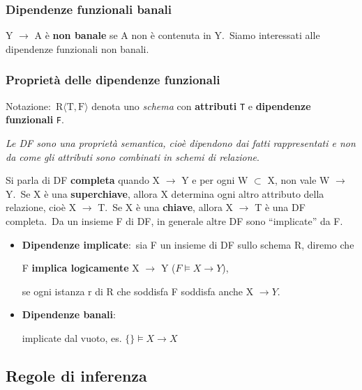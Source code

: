 \subsubsection{Dipendenze funzionali banali}

Y $\rightarrow$ A è \textbf{non banale} se A non è contenuta in Y.\
Siamo interessati alle dipendenze funzionali non banali.

\subsubsection{Proprietà delle dipendenze funzionali}

Notazione:\ $\mathrm{R\langle T,F \rangle}$ denota uno \textit{schema} con \textbf{attributi} \texttt{T} e \textbf{dipendenze funzionali} \texttt{F}.\

\vspace{12pt}
\noindent \textit{Le DF sono una proprietà semantica, cioè dipendono dai fatti rappresentati e non da come gli attributi sono combinati in schemi di relazione}.\
\vspace{12pt}

\noindent Si parla di DF \textbf{completa} quando X $\rightarrow$ Y e per ogni W $\subset$ X, non vale W $\rightarrow$ Y.\
Se X è una \textbf{superchiave}, allora X determina ogni altro attributo della relazione, cioè X $\rightarrow$ T.\
Se X è una \textbf{chiave}, allora X $\rightarrow$ T è una DF completa.\
Da un insieme F di DF, in generale altre DF sono ``implicate'' da F.

\begin{itemize}
	\item\textbf{Dipendenze implicate}:\ sia F un insieme di DF sullo schema R, diremo che
	      \begin{center}
		      F \textbf{implica logicamente}  X $\rightarrow$ Y ($F \models X \rightarrow Y$),
	      \end{center}
	      se ogni istanza r di R che soddisfa F soddisfa anche X $\rightarrow Y$.\
	\item\textbf{Dipendenze banali}:\
	      \begin{center}
		      implicate dal vuoto, es. $\{\} \models X \rightarrow X$
	      \end{center}
\end{itemize}

\subsection{Regole di inferenza}

